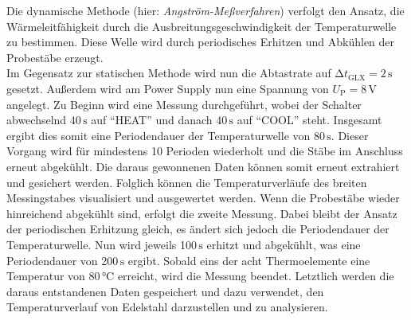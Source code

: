 Die dynamische Methode (hier: \emph{Angström-Meßverfahren}) verfolgt den Ansatz, die Wärmeleitfähigkeit durch die Ausbreitungsgeschwindigkeit der Temperaturwelle zu bestimmen. Diese Welle
wird durch periodisches Erhitzen und Abkühlen der Probestäbe erzeugt. \\ Im Gegensatz zur statischen Methode wird nun die Abtastrate auf $\increment t_\text{GLX} = 2\,\unit{\second}$ gesetzt.
Außerdem wird am Power Supply nun eine Spannung von $U_\text{P} = 8\,\unit{\volt}$ angelegt. Zu Beginn wird eine Messung durchgeführt, wobei der Schalter abwechselnd 40\,$\unit{\second}$ auf \enquote{HEAT} und danach 40\,$\unit{\second}$ auf \enquote{COOL} steht. Insgesamt ergibt dies somit eine 
Periodendauer der Temperaturwelle von 80\,$\unit{\second}$. Dieser Vorgang wird für mindestens 10 Perioden wiederholt und die Stäbe im Anschluss erneut abgekühlt. Die daraus gewonnenen Daten können somit erneut extrahiert
und gesichert werden. Folglich können die Temperaturverläufe des breiten Messingstabes visualisiert und ausgewertet werden. Wenn die Probestäbe wieder hinreichend abgekühlt sind, erfolgt die zweite Messung.
Dabei bleibt der Ansatz der periodischen Erhitzung gleich, es ändert sich jedoch die Periodendauer der Temperaturwelle. Nun wird jeweils 100\,$\unit{\second}$ erhitzt und abgekühlt, was eine Periodendauer von
{200\,$\unit{\second}$} ergibt. Sobald eins der acht Thermoelemente eine Temperatur von 80\,$\unit{\celsius}$ erreicht, wird die Messung beendet. Letztlich werden die daraus entstandenen Daten gespeichert und dazu verwendet, 
den Temperaturverlauf von Edelstahl darzustellen und zu analysieren.

%

